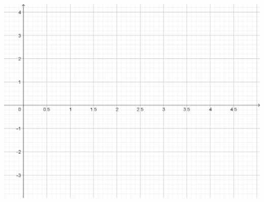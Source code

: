 \documentclass[oneside]{book}
\begin{document}
\begin{landscape}
		\includegraphics[scale=0.9]{Bilder/UB_Koord.png}
	\end{landscape}
\end{document}
